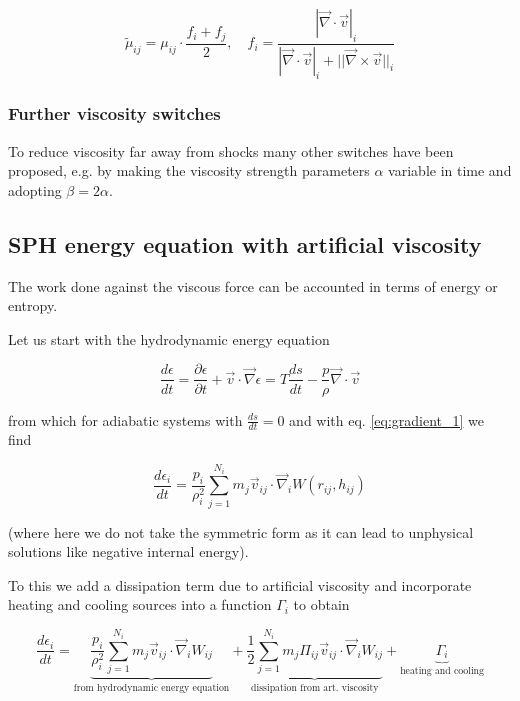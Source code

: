\begin{equation}
    \tilde{\mu}_{ij} = \mu_{ij} \cdot \frac{f_i + f_j}{2}, \quad f_i = \frac{|\vec{\nabla}\cdot \vec{v}|_i}{|\vec{\nabla}\cdot \vec{v}|_i + ||\vec{\nabla} \times \vec{v}||_i}
\end{equation}

\subsubsection{Further viscosity switches}
To reduce viscosity far away from shocks many other switches have been proposed,
e.g. by making the viscosity strength parameters $\alpha$ variable in time and adopting $\beta = 2 \alpha$.


\subsection{SPH energy equation with artificial viscosity}
The work done against the viscous force can be accounted in terms of energy or entropy.

Let us start with the hydrodynamic energy equation

\begin{equation}
    \frac{d \epsilon}{d t}=\frac{\partial \epsilon}{\partial t}+\vec{v} \cdot \vec{\nabla} \epsilon=T\frac{ds}{d t}-\frac{p}{\rho} \vec{\nabla} \cdot \vec{v}
\end{equation}

from which for adiabatic systems with $\frac{d s}{d t}=0$ and with eq. \ref{eq:gradient_1} we find

\begin{equation}
    \frac{d \epsilon_i}{d t}=\frac{p_i}{\rho_i^2} \sum_{j=1}^{N_i} m_j \vec{v}_{i j} \cdot \vec{\nabla}_i W\left(r_{i j}, h_{i j}\right)
\end{equation}

(where here we do not take the symmetric form as it can lead to unphysical solutions like negative internal energy).

To this we add a dissipation term due to artificial viscosity and incorporate
heating and cooling sources into a function $\Gamma_i$ to obtain

\begin{equation}
    \boxed{\frac{d \epsilon_i}{d t}=\underbrace{\frac{p_i}{\rho_i^2} \sum_{j=1}^{N_i} m_j \vec{v}_{i j} \cdot \vec{\nabla}_i W_{i j}}_{\text{from hydrodynamic energy equation}}+\underbrace{\frac{1}{2} \sum_{j=1}^{N_i} m_j \Pi_{i j} \vec{v}_{i j} \cdot \vec{\nabla}_i W_{i j}}_{\text{dissipation from art. viscosity}}+\underbrace{\Gamma_i}_{\text{heating and cooling}}}
\end{equation}

